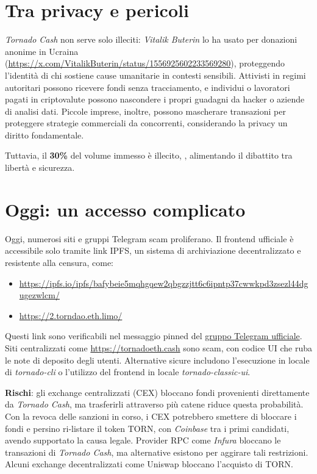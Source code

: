 \section{Tra privacy e pericoli}
\textit{Tornado Cash} non serve solo illeciti: \textit{Vitalik Buterin} lo ha usato per donazioni anonime in Ucraina (\url{https://x.com/VitalikButerin/status/1556925602233569280}), proteggendo l’identità di chi sostiene cause umanitarie in contesti sensibili. Attivisti in regimi autoritari possono ricevere fondi senza tracciamento, e individui o lavoratori pagati in criptovalute possono nascondere i propri guadagni da hacker o aziende di analisi dati. Piccole imprese, inoltre, possono mascherare transazioni per proteggere strategie commerciali da concorrenti, considerando la privacy un diritto fondamentale. 

Tuttavia, il \textbf{30\%} del volume immesso è illecito, \cite{chainalysis2022}, alimentando il dibattito tra libertà e sicurezza.

\section{Oggi: un accesso complicato}
Oggi, numerosi siti e gruppi Telegram scam proliferano. Il frontend ufficiale è accessibile solo tramite link IPFS, un sistema di archiviazione decentralizzato e resistente alla censura, come:
\begin{itemize}
    \item \url{https://ipfs.io/ipfs/bafybeie5mqhgqew2qbgzzjtt6c6ipntp37cwwkpd3zsezl44dgugezwlcm/}
    \item \url{https://2.torndao.eth.limo/}
\end{itemize}
Questi link sono verificabili nel messaggio pinned del \href{https://t.me/TornadoCashOfficialDAO/}{gruppo Telegram ufficiale}. Siti centralizzati come \url{https://tornadoeth.cash} sono scam, con codice UI che ruba le note di deposito degli utenti. Alternative sicure includono l’esecuzione in locale di \textit{tornado-cli} o l’utilizzo del frontend in locale \textit{tornado-classic-ui}.

\textbf{Rischi}: gli exchange centralizzati (CEX) bloccano fondi provenienti direttamente da \textit{Tornado Cash}, ma trasferirli attraverso più catene riduce questa probabilità. Con la revoca delle sanzioni in corso, i CEX potrebbero smettere di bloccare i fondi e persino ri-listare il token TORN, con \textit{Coinbase}\cite{coinbase} tra i primi candidati, avendo supportato la causa legale. Provider RPC come \textit{Infura}\cite{infura} bloccano le transazioni di \textit{Tornado Cash}, ma alternative esistono per aggirare tali restrizioni. Alcuni exchange decentralizzati come Uniswap bloccano l'acquisto di TORN.

